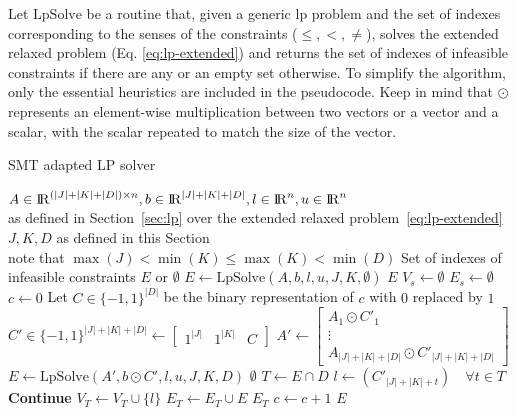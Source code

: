 \documentclass[runningheads]{llncs}
\begin{document}
Let $\text{LpSolve}$ be a routine that, given a generic \gls{lp} problem and the set of indexes corresponding to the senses of the constraints ($\le, <, \ne$), solves the extended relaxed problem (Eq. \eqref{eq:lp-extended}) and returns the set of indexes of infeasible constraints if there are any or an empty set otherwise.
To simplify the algorithm, only the essential heuristics are included in the pseudocode.
Keep in mind that $\odot$ represents an element-wise multiplication between two vectors or a vector and a scalar, with the scalar repeated to match the size of the vector.
\begin{algorithm}
    \caption{SMT adapted LP solver}\label{alg:theory-solver}
    \begin{algorithmic}
        \Require $A \in {\rm I\!R}^{(|J| + |K| + |D|) \times n}, b \in {\rm I\!R}^{|J| + |K| + |D|}, l \in {\rm I\!R}^n, u \in {\rm I\!R}^n$ \\
        \qquad as defined in Section~\ref{sec:lp} over the extended relaxed problem~\eqref{eq:lp-extended}
        \Require $J, K, D$ as defined in this Section \\
        \qquad note that $\max(J) < \min(K) \le \max(K) < \min(D)$
        \Ensure Set of indexes of infeasible constraints $E$ or $\emptyset$
        \State $E \gets \text{LpSolve}(A, b, l, u, J, K, \emptyset)$ 
        \State \Return $E$
        \EndIf
        \State $V_s \gets \emptyset$
        \State $E_s \gets \emptyset$
        \EndFor
        \State $c \gets 0$ 
        \State Let $C \in \{-1, 1\}^{|D|}$ be the binary representation of $c$ with $0$ replaced by $1$
        \State $C' \in \{-1, 1\}^{|J|+|K|+|D|} \gets \begin{bmatrix} 1^{|J|} & 1^{|K|} & C\end{bmatrix}$
        \State $A' \gets \begin{bmatrix}A_1 \odot C'_1 \\ \vdots \\ A_{|J|+|K|+|D|} \odot C'_{|J|+|K|+|D|}\end{bmatrix}$
        \State $E \gets \text{LpSolve}(A', b \odot C', l, u, J, K, D)$
         
        \State \Return $\emptyset$
        \EndIf
        \State $T \gets E \cap D$
        \State $l \gets (C'_{|J| + |K| + t}) \quad \forall t \in T$ %
         
        \State \textbf{Continue}
        \EndIf
        \State $V_T \gets V_T \cup \{l\}$
        \State $E_T \gets E_T \cup E$
         
        \State \Return $E_T$
        \EndIf
        \State $c \gets c + 1$
        \EndWhile
        \State \Return $E$
    \end{algorithmic}
\end{algorithm}
\end{document}
